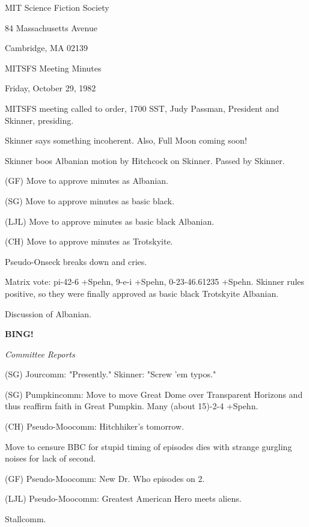 \documentclass[12pt]{article}
\newcommand{\bing}{{\bf BING!} }
\newcommand{\goto}[1]{\bing \vskip 12pt \centerline{{\em{#1}}}}
\begin{document}
\begin{center}

MIT Science Fiction Society 

84 Massachusetts Avenue

Cambridge, MA 02139

\vspace{12pt}

MITSFS Meeting Minutes 

Friday, October 29, 1982

\end{center}
 
\vspace{18pt}

\setlength{\parskip}{6pt}

\noindent
MITSFS meeting called to order, 1700 SST,
Judy Passman, President and Skinner, presiding.

Skinner says something incoherent. Also, Full Moon coming soon!

Skinner boos Albanian motion by Hitchcock on Skinner. Passed by Skinner.

(GF) Move to approve minutes as Albanian.

(SG) Move to approve minutes as basic black.

(LJL) Move to approve minutes as basic black Albanian.

(CH) Move to approve minutes as Trotskyite.

Pseudo-Onseck breaks down and cries.

Matrix vote: pi-42-6 +Spehn, 9-e-i +Spehn, 0-23-46.61235 +Spehn. Skinner rules positive, so they were finally approved as basic black Trotskyite Albanian.

Discussion of Albanian.

\goto{Committee Reports}

(SG) Jourcomm: "Presently." Skinner: "Screw 'em typos."

(SG) Pumpkincomm: Move to move Great Dome over Transparent Horizons and thus reaffirm faith in Great Pumpkin. Many (about 15)-2-4 +Spehn.

(CH) Pseudo-Moocomm: Hitchhiker's tomorrow.

Move to censure BBC for stupid timing of episodes dies with strange gurgling noises for lack of second.

(GF) Pseudo-Moocomm: New Dr. Who episodes on 2.

(LJL) Pseudo-Moocomm: Greatest American Hero meets aliens.

Stallcomm.
\end{document}
